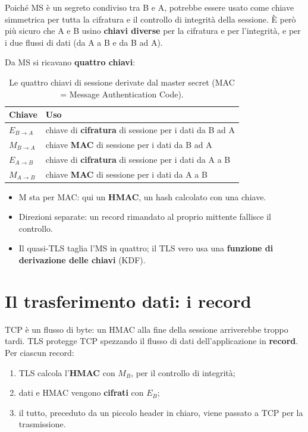 Poiché MS è un segreto condiviso tra B e A, potrebbe essere usato come chiave simmetrica per tutta la cifratura e il controllo di integrità della
sessione. È però più sicuro che A e B usino \textbf{chiavi diverse} per la cifratura e per l'integrità, e per i due flussi di dati (da A a B e da B ad A).

Da MS si ricavano \textbf{quattro chiavi}:

\begin{table}[H]
\centering
\begin{tabular}{ll}
\toprule
\textbf{Chiave} & \textbf{Uso} \\
\midrule
$E_{B\rightarrow A}$ & chiave di \textbf{cifratura} di sessione per i dati da B ad A \\
$M_{B\rightarrow A}$ & chiave \textbf{MAC} di sessione per i dati da B ad A \\
$E_{A\rightarrow B}$ & chiave di \textbf{cifratura} di sessione per i dati da A a B \\
$M_{A\rightarrow B}$ & chiave \textbf{MAC} di sessione per i dati da A a B \\
\bottomrule
\end{tabular}
\caption{Le quattro chiavi di sessione derivate dal master secret (MAC = Message Authentication Code).}
\end{table}

\begin{itemize}
    \item M sta per MAC: qui un \textbf{HMAC}, un hash calcolato con una chiave.
    \item Direzioni separate: un record rimandato al proprio mittente fallisce il controllo.
    \item Il quasi-TLS taglia l'MS in quattro; il TLS vero usa una \textbf{funzione di derivazione delle chiavi} (KDF).
\end{itemize}

\section{Il trasferimento dati: i record}

TCP è un flusso di byte: un HMAC alla fine della sessione arriverebbe troppo tardi. TLS protegge TCP spezzando il flusso di dati
dell'applicazione in \textbf{record}. Per ciascun record:

\begin{enumerate}
    \item TLS calcola l'\textbf{HMAC} con $M_B$, per il controllo di integrità;
    \item dati e HMAC vengono \textbf{cifrati} con $E_B$;
    \item il tutto, preceduto da un piccolo header in chiaro, viene passato a TCP per la trasmissione.
\end{enumerate}

